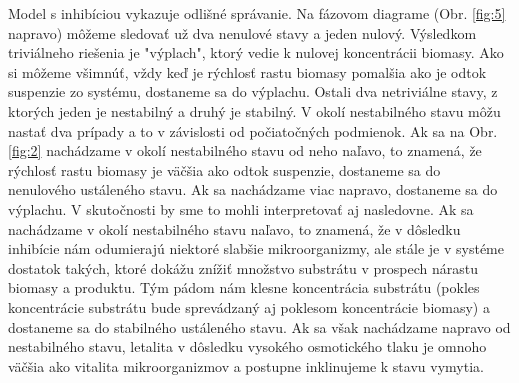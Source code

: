 Model s inhibíciou vykazuje odlišné správanie. Na fázovom diagrame (Obr. \ref{fig:5} napravo) môžeme sledovať už dva nenulové stavy a jeden nulový. Výsledkom triviálneho riešenia je "výplach", ktorý vedie k nulovej koncentrácii biomasy. Ako si môžeme všimnúť, vždy keď je rýchlosť rastu biomasy pomalšia ako je odtok suspenzie zo systému, dostaneme sa do výplachu. Ostali dva netriviálne stavy, z ktorých jeden je nestabilný a druhý je stabilný. V okolí nestabilného stavu môžu nastať dva prípady a to v závislosti od počiatočných podmienok. Ak sa na Obr. \ref{fig:2} nachádzame v okolí nestabilného stavu od neho naľavo, to znamená, že rýchlosť rastu biomasy je väčšia ako odtok suspenzie, dostaneme sa do nenulového ustáleného stavu. Ak sa nachádzame viac napravo, dostaneme sa do výplachu. V skutočnosti by sme to mohli interpretovať aj nasledovne. Ak sa nachádzame v okolí nestabilného stavu naľavo, to znamená, že v dôsledku inhibície nám odumierajú niektoré slabšie mikroorganizmy, ale stále je v systéme dostatok takých, ktoré dokážu znížiť množstvo substrátu v prospech nárastu biomasy a produktu. Tým pádom nám klesne koncentrácia substrátu (pokles koncentrácie substrátu bude sprevádzaný aj poklesom koncentrácie biomasy) a dostaneme sa do stabilného ustáleného stavu. Ak sa však nachádzame napravo od nestabilného stavu, letalita v dôsledku vysokého osmotického tlaku je omnoho väčšia ako vitalita mikroorganizmov a postupne inklinujeme k stavu vymytia.

